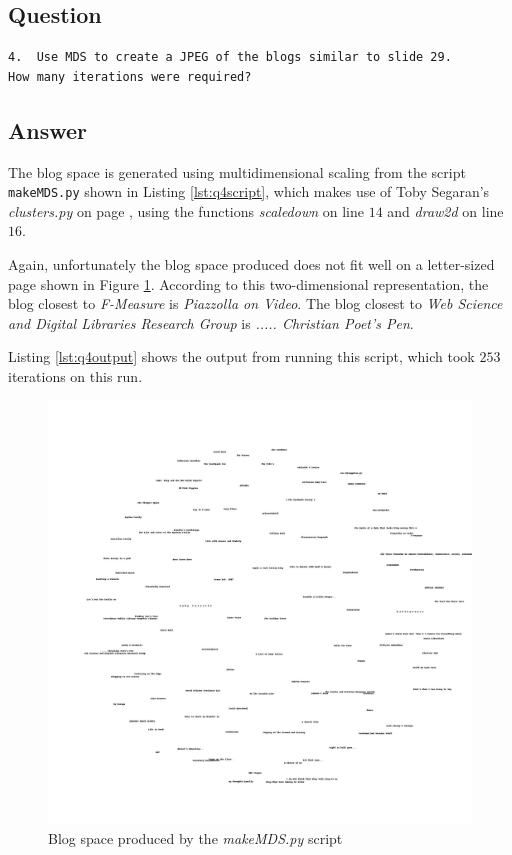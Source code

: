 \documentclass[letterpaper,11pt]{article}
\begin{document}
\subsection*{Question}

\begin{verbatim}
4.  Use MDS to create a JPEG of the blogs similar to slide 29.  
How many iterations were required?
\end{verbatim}

\subsection*{Answer}

The blog space is generated using multidimensional scaling from the script \verb+makeMDS.py+ shown in Listing \ref{lst:q4script}, which makes use of Toby Segaran's \emph{clusters.py} \cite{pci} on page \pageref{lst:appSegaran2}, using the functions \emph{scaledown} on line $14$ and \emph{draw2d} on line $16$.



Again, unfortunately the blog space produced does not fit well on a letter-sized page shown in Figure \ref{fig:q4MDS}.  According to this two-dimensional representation, the blog closest to \emph{F-Measure} is \emph{Piazzolla on Video}.  The blog closest to \emph{Web Science and Digital Libraries Research Group} is \emph{..... Christian Poet's Pen}.

Listing \ref{lst:q4output} shows the output from running this script, which took $253$ iterations on this run.

\clearpage
\begin{figure}[h]
\centerline{\includegraphics[scale=0.26]{q4/blogs2d.jpg}}
\caption{Blog space produced by the \emph{makeMDS.py} script}
\label{fig:q4MDS}
\end{figure}
\end{document}
